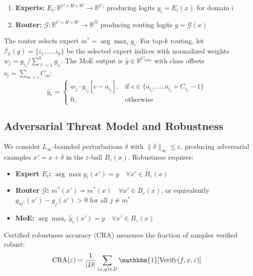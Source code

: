 \documentclass[11pt,a4paper]{article}
\begin{document}
\begin{enumerate}
    \item \textbf{Experts:} $E_i: \mathbb{R}^{C \times H \times W} \to \mathbb{R}^{C_i}$ producing logits $y_i = E_i(x)$ for domain $i$
    \item \textbf{Router:} $\mathcal{G}: \mathbb{R}^{C \times H \times W} \to \mathbb{R}^N$ producing routing logits $g = \mathcal{G}(x)$
\end{enumerate}

The router selects expert $m^* = \arg\max_i g_i$. For top-$k$ routing, let $\mathcal{I}_k(g) = \{i_1, \ldots, i_k\}$ be the selected expert indices with normalized weights $w_j = g_{i_j} / \sum_{\ell=1}^k g_{i_\ell}$. The MoE output is $\hat{y} \in \mathbb{R}^{C_{total}}$ with class offsets $o_i = \sum_{m<i} C_m$:
\begin{equation}
    \hat{y}_c = \begin{cases}
        w_j \cdot y_{i_j}[c - o_{i_j}], & \text{if } c \in \{o_{i_j}, \ldots, o_{i_j} + C_{i_j} - 1\} \\
        0, & \text{otherwise}
    \end{cases}
\end{equation}

\subsection{Adversarial Threat Model and Robustness}

We consider $L_\infty$-bounded perturbations $\delta$ with $\|\delta\|_\infty \leq \varepsilon$, producing adversarial examples $x' = x + \delta$ in the $\varepsilon$-ball $B_\varepsilon(x)$. Robustness requires:

\begin{itemize}
    \item \textbf{Expert $E_i$:} $\arg\max y_i(x') = y \quad \forall x' \in B_\varepsilon(x)$
    \item \textbf{Router $\mathcal{G}$:} $m^*(x') = m^*(x) \quad \forall x' \in B_\varepsilon(x)$, or equivalently $g_{m^*}(x') - g_j(x') > 0$ for all $j \neq m^*$
    \item \textbf{MoE:} $\arg\max_c \hat{y}_c(x') = y \quad \forall x' \in B_\varepsilon(x)$
\end{itemize}

Certified robustness accuracy (CRA) measures the fraction of samples verified robust:
\begin{equation}
    \text{CRA}(\varepsilon) = \frac{1}{|D|} \sum_{(x,y) \in D} \mathbbm{1}[\text{Verify}(f, x, \varepsilon)]
\end{equation}
\end{document}
